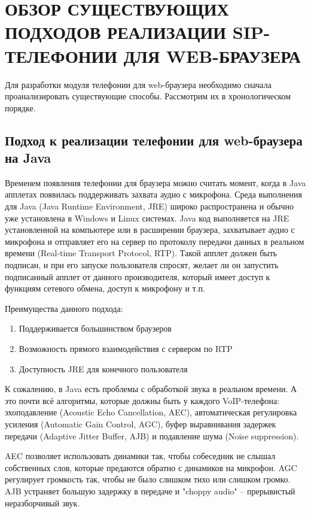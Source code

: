 \chapter{ОБЗОР СУЩЕСТВУЮЩИХ ПОДХОДОВ РЕАЛИЗАЦИИ SIP-ТЕЛЕФОНИИ ДЛЯ WEB-БРАУЗЕРА}
\label{chapter:analysis}

Для разработки модуля телефонии для web-браузера необходимо сначала проанализировать существующие способы. Рассмотрим их в хронологическом порядке.

\section{Подход к реализации телефонии для web-браузера на Java}

Временем появления телефонии для браузера можно считать момент, когда в Java апплетах появилась поддерживать захвата аудио с микрофона. Среда выполнения для Java (Java Runtime Environment, JRE) широко распространена и обычно уже установлена в Windows и Linux системах.\cite{webrtc_flash_java} Java код выполняется на JRE установленной на компьютере или в расширении браузера, захватывает аудио с микрофона и отправляет его на сервер по протоколу передачи данных в реальном времени (Real-time Transport Protocol, RTP). Такой апплет должен быть подписан, и при его запуске пользователя спросят, желает ли он запустить подписанный апплет от данного производителя, который имеет доступ к функциям сетевого обмена, доступ к микрофону и т.п.

Преимущества данного подхода:
\begin{enumerate}
\item Поддерживается большинством браузеров
\item Возможность прямого взаимодействия с сервером по RTP
\item Доступность JRE для конечного пользователя
\end{enumerate}

К сожалению, в Java есть проблемы с обработкой звука в реальном времени. А это почти всё алгоритмы, которые должны быть у каждого VoIP-телефона: эхоподавление (Acoustic Echo Cancellation, AEC), автоматическая регулировка усиления (Automatic Gain Control, AGC), буфер выравнивания задержек передачи (Adaptive Jitter Buffer, AJB) и подавление шума (Noise suppression).

AEC позволяет использовать динамики так, чтобы собеседник не слышал собственных слов, которые предаются обратно с динамиков на микрофон. AGC регулирует громкость так, чтобы не было слишком тихо или слишком громко. AJB устраняет большую задержку в передаче и "choppy audio" – прерывистый неразборчивый звук.


